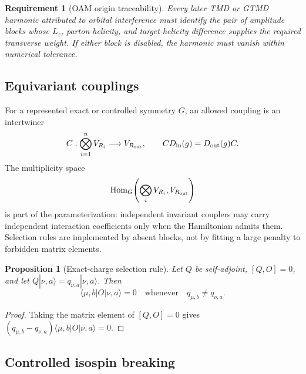 \documentclass[11pt]{article}
\newtheorem{requirement}[definition]{Requirement}
\newtheorem{proposition}[definition]{Proposition}
\newcommand{\Hom}{\operatorname{Hom}}
\newcommand{\comm}[2]{[#1,#2]}
\begin{document}
\begin{requirement}[OAM origin traceability]
\label{req:oam-traceability}
Every later TMD or GTMD harmonic attributed to orbital interference must
identify the pair of amplitude blocks whose \(L_z\), parton-helicity, and
target-helicity difference supplies the required transverse weight.  If
either block is disabled, the harmonic must vanish within numerical
tolerance.
\end{requirement}

\subsection{Equivariant couplings}

For a represented exact or controlled symmetry \(G\), an allowed coupling is
an intertwiner
\begin{equation}
 C:\bigotimes_{i=1}^nV_{R_i}\longrightarrow V_{R_{\rm out}},
 \qquad
 C D_{\rm in}(g)=D_{\rm out}(g)C.
\label{eq:general-intertwiner}
\end{equation}
The multiplicity space
\begin{equation}
 \Hom_G\!\left(\bigotimes_iV_{R_i},V_{R_{\rm out}}\right)
\label{eq:intertwiner-space}
\end{equation}
is part of the parameterization: independent invariant couplers may carry
independent interaction coefficients only when the Hamiltonian admits them.
Selection rules are implemented by absent blocks, not by fitting a large
penalty to forbidden matrix elements.

\begin{proposition}[Exact-charge selection rule]
\label{prop:selection-rule}
Let \(Q\) be self-adjoint, \(\comm{Q}{O}=0\), and let
\(Q|\nu,a\rangle=q_{\nu,a}|\nu,a\rangle\).  Then
\begin{equation}
 \langle\mu,b|O|\nu,a\rangle=0
 \quad\text{whenever}\quad q_{\mu,b}\ne q_{\nu,a}.
\label{eq:selection-rule}
\end{equation}
\end{proposition}

\begin{proof}
Taking the matrix element of \([Q,O]=0\) gives
\((q_{\mu,b}-q_{\nu,a})\langle\mu,b|O|\nu,a\rangle=0\).
\end{proof}

\subsection{Controlled isospin breaking}
\end{document}
